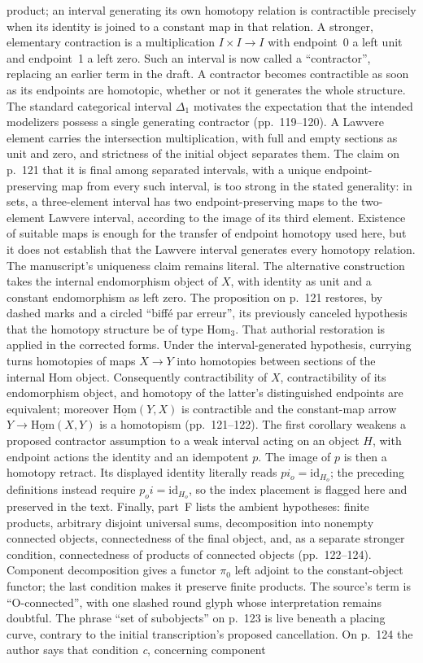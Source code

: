 \documentclass[10pt,oneside]{book}
\begin{document}
product; an interval generating its own homotopy relation is contractible precisely when its identity is joined to a constant map in that relation. A stronger, elementary contraction is a multiplication $I\times I\to I$ with endpoint~0 a left unit and endpoint~1 a left zero. Such an interval is now called a ``contractor'', replacing an earlier term in the draft. A contractor becomes contractible as soon as its endpoints are homotopic, whether or not it generates the whole structure. The standard categorical interval $\Delta_1$ motivates the expectation that the intended modelizers possess a single generating contractor (pp.~119--120). A Lawvere element carries the intersection multiplication, with full and empty sections as unit and zero, and strictness of the initial object separates them. The claim on p.~121 that it is final among separated intervals, with a unique endpoint-preserving map from every such interval, is too strong in the stated generality: in sets, a three-element interval has two endpoint-preserving maps to the two-element Lawvere interval, according to the image of its third element. Existence of suitable maps is enough for the transfer of endpoint homotopy used here, but it does not establish that the Lawvere interval generates every homotopy relation. The manuscript's uniqueness claim remains literal. The alternative construction takes the internal endomorphism object of $X$, with identity as unit and a constant endomorphism as left zero. The proposition on p.~121 restores, by dashed marks and a circled ``biffé par erreur'', its previously canceled hypothesis that the homotopy structure be of type $\mathrm{Hom}_3$. That authorial restoration is applied in the corrected forms. Under the interval-generated hypothesis, currying turns homotopies of maps $X\to Y$ into homotopies between sections of the internal Hom object. Consequently contractibility of $X$, contractibility of its endomorphism object, and homotopy of the latter's distinguished endpoints are equivalent; moreover $\underline{\mathrm{Hom}}(Y,X)$ is contractible and the constant-map arrow $Y\to\underline{\mathrm{Hom}}(X,Y)$ is a homotopism (pp.~121--122). The first corollary weakens a proposed contractor assumption to a weak interval acting on an object $H$, with endpoint actions the identity and an idempotent $p$. The image of $p$ is then a homotopy retract. Its displayed identity literally reads $pi_o=\mathrm{id}_{H_o}$; the preceding definitions instead require $p_oi=\mathrm{id}_{H_o}$, so the index placement is flagged here and preserved in the text. Finally, part~F lists the ambient hypotheses: finite products, arbitrary disjoint universal sums, decomposition into nonempty connected objects, connectedness of the final object, and, as a separate stronger condition, connectedness of products of connected objects (pp.~122--124). Component decomposition gives a functor $\pi_0$ left adjoint to the constant-object functor; the last condition makes it preserve finite products. The source's term is ``O-connected'', with one slashed round glyph whose interpretation remains doubtful. The phrase ``set of subobjects'' on p.~123 is live beneath a placing curve, contrary to the initial transcription's proposed cancellation. On p.~124 the author says that condition \emph{c}, concerning component 
\end{document}
